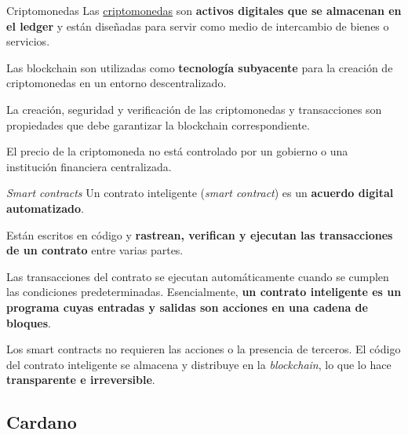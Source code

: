 \documentclass{beamer}
\begin{document}
\begin{frame}{Criptomonedas}
Las \underline{criptomonedas} son \textbf{activos digitales que se almacenan en el ledger} y están diseñadas para servir como medio de intercambio de bienes o servicios. 

\pause
\vfill

Las blockchain son utilizadas como \textbf{tecnología subyacente} para la creación de criptomonedas en un entorno descentralizado. 

\pause
\vfill

La creación, seguridad y verificación de las criptomonedas y transacciones son propiedades que debe garantizar la blockchain correspondiente.

\pause
\vfill

El precio de la criptomoneda no está controlado por un gobierno o una institución financiera centralizada.

\end{frame}

\begin{frame}{\textit{Smart contracts}}
Un contrato inteligente (\textit{smart contract}) es un \textbf{acuerdo digital automatizado}.

\pause
\vfill

Están escritos en código y \textbf{rastrean, verifican y ejecutan las transacciones de un contrato} entre varias partes.

\pause
\vfill

Las transacciones del contrato se ejecutan automáticamente cuando se cumplen las condiciones predeterminadas. Esencialmente, \textbf{un contrato inteligente es un programa cuyas entradas y salidas son acciones en una cadena de bloques}.

\pause
\vfill

Los smart contracts no requieren las acciones o la presencia de terceros. El código del contrato inteligente se almacena y distribuye en la \textit{blockchain}, lo que lo hace \textbf{transparente e irreversible}.

\end{frame}

\subsection{Cardano}
\end{document}
